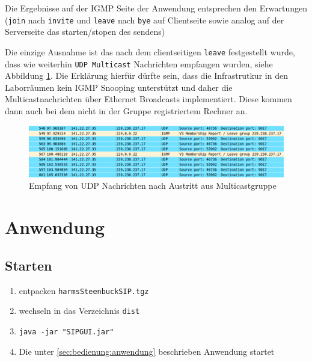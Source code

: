 \documentclass[10pt]{scrartcl}
\begin{document}
	Die Ergebnisse auf der IGMP Seite der Anwendung entsprechen den Erwartungen (\verb!join! nach \verb!invite! und \verb!leave! nach \verb!bye! auf Clientseite sowie analog auf der Serverseite das starten/stopen des sendens)
	
	Die einzige Ausnahme ist das nach dem clientseitigen \verb!leave! festgestellt wurde, dass wie weiterhin \verb!UDP Multicast! Nachrichten empfangen wurden, siehe Abbildung \ref{img:cap1}. 
	Die Erklärung hierfür dürfte sein, dass die Infrastrutkur in den Laborräumen kein IGMP Snooping unterstützt und daher die Multicastnachrichten über Ethernet Broadcasts implementiert. Diese kommen dann auch bei dem nicht in der Gruppe registriertem Rechner an.
	
	
	\begin{figure}[htb]
        \centering
         \includegraphics[width=\textwidth]{img/udp_after_leaving}
         \caption{Empfang von UDP Nachrichten nach Austritt aus Multicastgruppe}
        \label{img:cap1}
	\end{figure}	



\section{Anwendung}

\subsection{Starten}
\begin{enumerate}
	\item entpacken \verb!harmsSteenbuckSIP.tgz!
	\item wechseln in das Verzeichnis \verb!dist!
	\item \verb!java -jar "SIPGUI.jar"!
	\item Die unter \ref{sec:bedienung:anwendung} beschrieben Anwendung startet
\end{enumerate}
\end{document}
